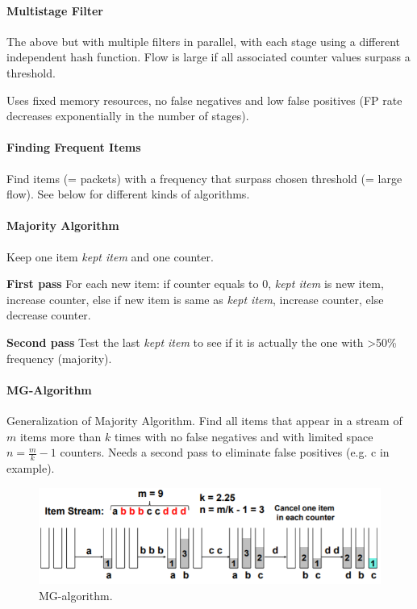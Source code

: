 \paragraph{Multistage Filter}
The above but with multiple filters in parallel, with each stage using a different independent hash function. Flow is large if all associated counter values surpass a threshold.

Uses fixed memory resources, no false negatives and low false positives (FP rate decreases exponentially in the number of stages).

\paragraph{Finding Frequent Items}
Find items (= packets) with a frequency that surpass chosen threshold (= large flow). See below for different kinds of algorithms.

\paragraph{Majority Algorithm}
Keep one item \textit{kept item} and one counter.

\textbf{First pass} For each new item: if counter equals to 0, \textit{kept item} is new item, increase counter, else if new item is same as \textit{kept item}, increase counter, else decrease counter.

\textbf{Second pass} Test the last \textit{kept item} to see if it is actually the one with >50\% frequency (majority).

\paragraph{MG-Algorithm}
Generalization of Majority Algorithm. Find all items that appear in a stream of $m$ items more than $k$ times with no false negatives and with limited space $n = \frac{m}{k} - 1$ counters. Needs a second pass to eliminate false positives (e.g. c in example).

\begin{figure}[h]
	\centering
	\includegraphics[scale=0.8]{images/917-mg.PNG}
	\caption{MG-algorithm.}
	\label{fig:mg}
\end{figure}

